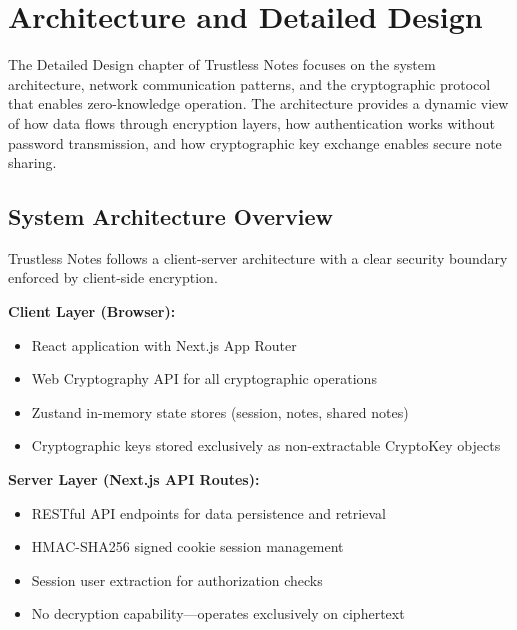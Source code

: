 
\chapter{Architecture and Detailed Design}

The Detailed Design chapter of Trustless Notes focuses on the system architecture, network communication patterns, and the cryptographic protocol that enables zero-knowledge operation. The architecture provides a dynamic view of how data flows through encryption layers, how authentication works without password transmission, and how cryptographic key exchange enables secure note sharing.

\section{System Architecture Overview}

Trustless Notes follows a client-server architecture with a clear security boundary enforced by client-side encryption.

\textbf{Client Layer (Browser):}
\begin{itemize}
    \item React application with Next.js App Router
    \item Web Cryptography API for all cryptographic operations
    \item Zustand in-memory state stores (session, notes, shared notes)
    \item Cryptographic keys stored exclusively as non-extractable CryptoKey objects
\end{itemize}

\textbf{Server Layer (Next.js API Routes):}
\begin{itemize}
    \item RESTful API endpoints for data persistence and retrieval
    \item HMAC-SHA256 signed cookie session management
    \item Session user extraction for authorization checks
    \item No decryption capability---operates exclusively on ciphertext
\end{itemize}


